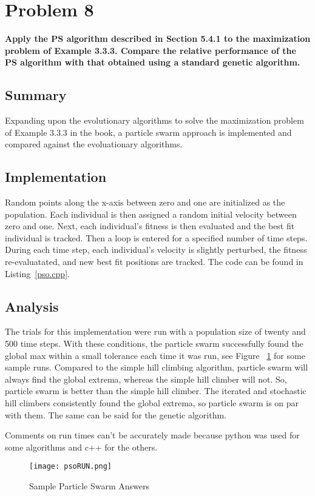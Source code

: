 \section{ Problem 8 }
\textbf{Apply the PS algorithm described in Section 5.4.1 to the maximization problem of Example 3.3.3. Compare the relative performance of the PS algorithm with that obtained using a standard genetic algorithm.} \newline 

\subsection{Summary}
Expanding upon the evolutionary algorithms to solve the maximization problem of Example 3.3.3 in the book, a particle swarm approach is implemented and compared against the evoluationary algorithms.

\subsection{Implementation}
Random points along the x-axis between zero and one are initialized as the population. Each individual is then assigned a random initial velocity between zero and one. Next, each individual's fitness is then evaluated and the best fit individual is tracked. Then a loop is entered for a specified number of time steps. During each time step, each individual's velocity is slightly perturbed, the fitness re-evaluatated, and new best fit positions are tracked. The code can be found in Listing~\ref{pso.cpp}.

\subsection{Analysis}
The trials for this implementation were run with a population size of twenty and 500 time steps. With these conditions, the particle swarm successfully found the global max within a small tolerance each time it was run, see Figure ~\ref{psoRun} for some sample runs. Compared to the simple hill climbing algorithm, particle swarm will always find the global extrema, whereas the simple hill climber will not. So, particle swarm is better than the simple hill climber. The iterated and stochastic hill climbers consistently found the global extrema, so particle swarm is on par with them. The same can be said for the genetic algorithm.

Comments on run times can't be accurately made because python was used for some algorithms and c++ for the others. 

\begin{figure}[tbh]
\begin{center}
\texttt{[image: psoRUN.png]}
\end{center}
\caption{ Sample Particle Swarm Answers } \label{psoRun}
\end{figure}